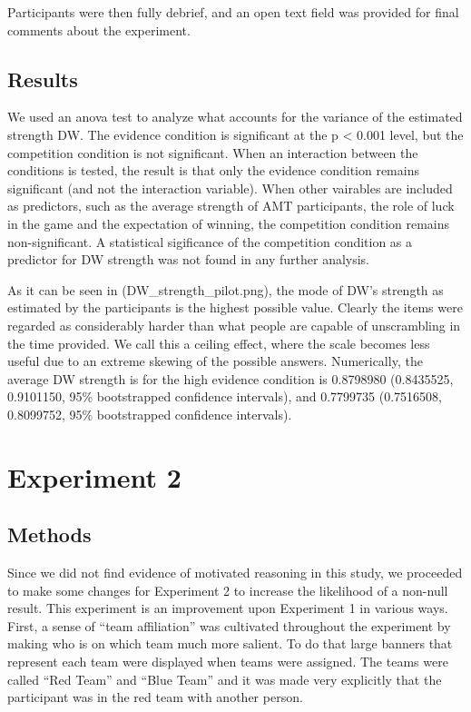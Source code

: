 \documentclass{article}
\begin{document}
Participants were then fully debrief, and an open text field was provided for final comments about the experiment. 




\subsection{Results}


We used an anova test to analyze what accounts for the variance of the estimated strength DW. The evidence condition is significant at the p < 0.001 level, but the competition condition is not significant. When an interaction between the conditions is tested, the result is that only the evidence condition remains significant (and not the interaction variable). When other vairables are included as predictors, such as the average strength of AMT participants, the role of luck in the game and the expectation of winning, the competition condition remains non-significant. A statistical sigificance of the competition condition as a predictor for DW strength was not found in any further analysis.

As it can be seen in (DW\_strength\_pilot.png), the mode of DW's strength as estimated by the participants is the highest possible value. Clearly the items were regarded as considerably harder than what people are capable of unscrambling in the time provided. We call this a ceiling effect, where the scale becomes less useful due to an extreme skewing of the possible answers. Numerically, the average DW strength is for the high evidence condition is 0.8798980 (0.8435525, 0.9101150, 95\% bootstrapped confidence intervals), and 0.7799735 (0.7516508, 0.8099752, 95\% bootstrapped confidence intervals).

\section{Experiment 2}

\subsection{Methods}
Since we did not find evidence of motivated reasoning in this study, we proceeded to make some changes for Experiment 2 to increase the likelihood of a non-null result. This experiment is an improvement upon Experiment 1 in various ways. First, a sense of ``team affiliation'' was cultivated throughout the experiment by making who is on which team much more salient. To do that large banners that represent each team were displayed when teams were assigned. The teams were called ``Red Team'' and ``Blue Team'' and it was made very explicitly that the participant was in the red team with another person. 
\end{document}
